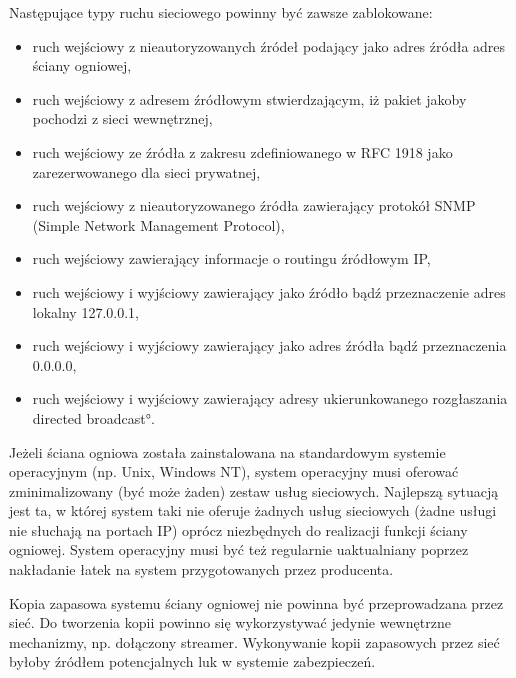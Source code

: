 Następujące typy ruchu sieciowego powinny być zawsze zablokowane:

\begin{itemize}

\item ruch wejściowy z nieautoryzowanych źródeł podający jako adres źródła
adres ściany ogniowej,

\item ruch wejściowy z adresem źródłowym stwierdzającym, iż pakiet jakoby
pochodzi z sieci wewnętrznej,

\item ruch wejściowy ze źródła z zakresu zdefiniowanego w RFC 1918 jako
zarezerwowanego dla sieci prywatnej,

\item ruch wejściowy z nieautoryzowanego źródła zawierający protokół SNMP
(Simple Network Management Protocol),

\item ruch wejściowy zawierający informacje o routingu źródłowym IP,

\item ruch wejściowy i wyjściowy zawierający jako źródło bądź przeznaczenie
adres lokalny 127.0.0.1,

\item ruch wejściowy i wyjściowy zawierający jako adres źródła bądź
przeznaczenia 0.0.0.0,

\item ruch wejściowy i wyjściowy zawierający adresy ukierunkowanego
rozgłaszania \ang{directed broadcast}.

\end{itemize}


Jeżeli ściana ogniowa została zainstalowana na standardowym systemie
operacyjnym (np. Unix, Windows NT), system operacyjny musi oferować
zminimalizowany (być może żaden) zestaw usług sieciowych. Najlepszą sytuacją
jest ta, w której system taki nie oferuje żadnych usług sieciowych (żadne
usługi nie słuchają na portach IP) oprócz niezbędnych do realizacji funkcji
ściany ogniowej. System operacyjny musi być też regularnie uaktualniany
poprzez nakładanie łatek na system przygotowanych przez producenta.

Kopia zapasowa systemu ściany ogniowej nie powinna być przeprowadzana przez
sieć. Do tworzenia kopii powinno się wykorzystywać jedynie wewnętrzne
mechanizmy, np. dołączony streamer. Wykonywanie kopii zapasowych przez sieć
byłoby źródłem potencjalnych luk w systemie zabezpieczeń.

